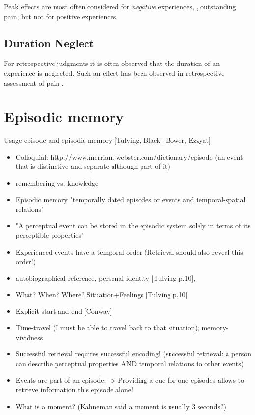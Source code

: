 Peak effects are most often considered for \emph{negative} experiences, \eg, outstanding pain, but not for positive experiences.

\subsection*{Duration Neglect}
For retrospective judgments it is often observed that the duration of an experience is neglected.
Such an effect has been observed in retrospective assessment of pain \citep[cf.,][]{fredrickson_duration_1993, ariely_combining_1998}.

\section{Episodic memory}
Usage episode and episodic memory [Tulving, Black+Bower, Ezzyat]
\begin{itemize}
\item Colloquial:  http://www.merriam-webster.com/dictionary/episode (an event that is distinctive and separate although part of it)
\item remembering vs. knowledge \cite{tulving_concepts_2000}

\item Episodic memory "temporally dated episodes or events and temporal-spatial relations" \cite[385]{tulving_concepts_2000}
\item "A perceptual event can be stored in the episodic system solely in terms of its perceptible properties"\cite[p. 385]{tulving_concepts_2000}
\item Experienced events have a temporal order (Retrieval should also reveal this order!)\cite{tulving_concepts_2000}

\item autobiographical reference, personal identity [Tulving p.10], \cite{conway_construction_????}
\item What? When? Where? Situation+Feelings [Tulving p.10]
\item Explicit start and end [Conway]
\item Time-travel (I must be able to travel back to that situation); memory-vividness \cite{conway_construction_????}

      
\item Successful retrieval requires successful encoding! (successful retrieval: a person can describe perceptual properties AND temporal relations to other events)

\item Events are part of an episode. -> Providing a cue for one episodes allows to retrieve information this episode alone!
\item What is a moment? (Kahneman said a moment is usually 3 seconds?)
\end{itemize}

